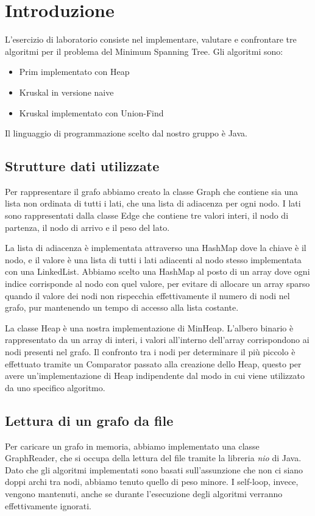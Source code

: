 \section{Introduzione}

L'esercizio di laboratorio consiste nel implementare, valutare e confrontare tre algoritmi per il problema del Minimum Spanning Tree. Gli algoritmi sono:
\begin{itemize}
	\item Prim implementato con Heap
	\item Kruskal in versione naive
	\item Kruskal implementato con Union-Find
\end{itemize}
Il linguaggio di programmazione scelto dal nostro gruppo è Java.


\subsection{Strutture dati utilizzate}

Per rappresentare il grafo abbiamo creato la classe Graph che contiene sia una lista non ordinata di tutti i lati, che una lista di adiacenza per ogni nodo.
I lati sono rappresentati dalla classe Edge che contiene tre valori interi, il nodo di partenza, il nodo di arrivo e il peso del lato.

La lista di adiacenza è implementata attraverso una HashMap dove la chiave è il nodo, e il valore è una lista di tutti i lati adiacenti al nodo stesso implementata con una LinkedList. Abbiamo scelto una HashMap al posto di un array dove ogni indice corrisponde al nodo con quel valore, per evitare di allocare un array sparso quando il valore dei nodi non rispecchia effettivamente il numero di nodi nel grafo, pur mantenendo un tempo di accesso alla lista costante.

La classe Heap è una nostra implementazione di MinHeap. L'albero binario è rappresentato da un array di interi, i valori all'interno dell'array corrispondono ai nodi presenti nel grafo. Il confronto tra i nodi per determinare il più piccolo è effettuato tramite un Comparator passato alla creazione dello Heap, questo per avere un'implementazione di Heap indipendente dal modo in cui viene utilizzato da uno specifico algoritmo.
\subsection{Lettura di un grafo da file}
Per caricare un grafo in memoria, abbiamo implementato una classe GraphReader, che si occupa della lettura del file tramite la libreria \textit{nio} di Java. Dato che gli algoritmi implementati sono basati sull'assunzione che non ci siano doppi archi tra nodi,
abbiamo tenuto quello di peso minore. I self-loop, invece, vengono mantenuti, anche se durante l'esecuzione degli algoritmi verranno effettivamente ignorati.
